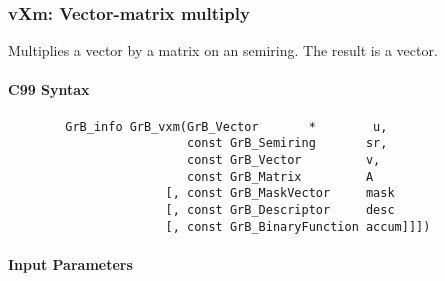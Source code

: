 \subsubsection{{\sf vXm}: Vector-matrix multiply}

Multiplies a vector by a matrix on an semiring. The result is a vector.

\paragraph{C99 Syntax}

\begin{verbatim}
        GrB_info GrB_vxm(GrB_Vector       *        u,
                         const GrB_Semiring       sr,
                         const GrB_Vector         v, 
                         const GrB_Matrix         A
                      [, const GrB_MaskVector     mask
                      [, const GrB_Descriptor     desc
                      [, const GrB_BinaryFunction accum]]])
\end{verbatim}

\paragraph{Input Parameters}

